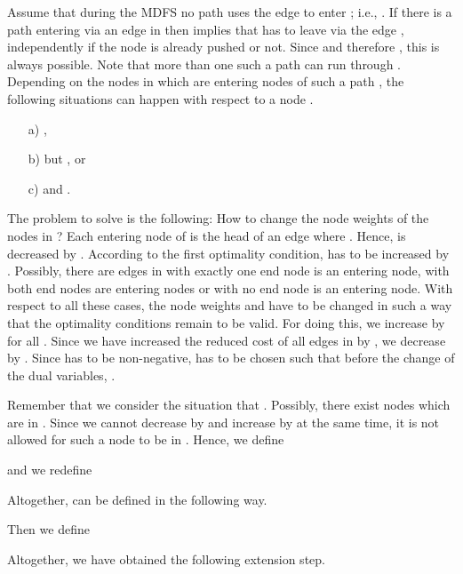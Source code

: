 \documentclass[12pt,twoside,a4paper]{article}
\begin{document}
Assume that during the MDFS no path uses the edge  to enter ; 
i.e., . If there is a path  entering  via an edge 
in  then  implies that  has to leave  via 
the edge , independently if the node  is already pushed or not. Since
 and therefore , this is always possible.
Note that more than one such a path can run through .
Depending on the nodes in  which are entering nodes of such a path ,
the following situations can happen with respect to a node .
\begin{itemize}
\item[a)]
,
\item[b)]
 but , or
\item[c)]
 and .
\end{itemize}
The problem to solve is the following: How to change the node weights of the
nodes in ?
Each entering node  of  is the head of an edge 
where . Hence,  is decreased by . According to 
the first optimality condition,   has to be increased by . 
Possibly, there are edges in  with exactly one end node is an entering node, 
with both end nodes are entering nodes or with no end node is an entering node. 
With respect to all these cases, the node weights and  have to be changed 
in such a way that the optimality conditions remain to be valid.
For doing this, we increase  by  for all .
Since we have increased the reduced cost of all edges in  by ,
we decrease  by . Since  has to be non-negative, 
 has to be chosen such that before the change of the dual variables,
. 

Remember that we consider the situation that .
Possibly, there exist nodes  which are
in . Since we cannot decrease  by  and increase  by
 at the same time, it is not allowed for such a node to be in . 
Hence, we define 

and we redefine

Altogether,  can be defined in the following way.

Then we define

Altogether, we have obtained the following extension step.
\end{document}
